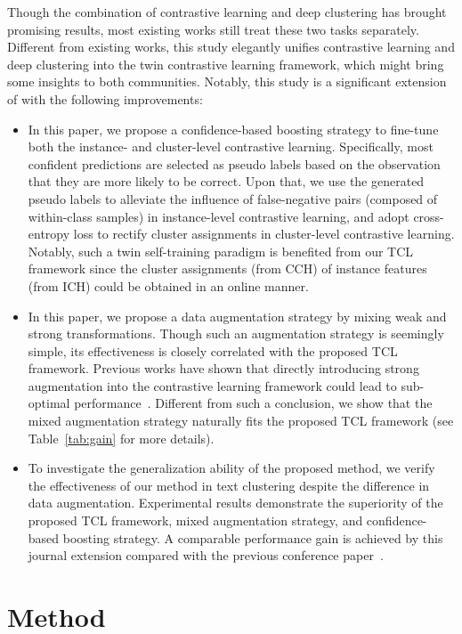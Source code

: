 Though the combination of contrastive learning and deep clustering has brought promising results, most existing works still treat these two tasks separately. Different from existing works, this study elegantly unifies contrastive learning and deep clustering into the twin contrastive learning framework, which might bring some insights to both communities. Notably, this study is a significant extension of \citep{CC} with the following improvements:
\begin{itemize}
	\item In this paper, we propose a confidence-based boosting strategy to fine-tune both the instance- and cluster-level contrastive learning. Specifically, most confident predictions are selected as pseudo labels based on the observation that they are more likely to be correct. Upon that, we use the generated pseudo labels to alleviate the influence of false-negative pairs (composed of within-class samples) in instance-level contrastive learning, and adopt cross-entropy loss to rectify cluster assignments in cluster-level contrastive learning. Notably, such a twin self-training paradigm is benefited from our TCL framework since the cluster assignments (from CCH) of instance features (from ICH) could be obtained in an online manner.
	\item In this paper, we propose a data augmentation strategy by mixing weak and strong transformations. Though such an augmentation strategy is seemingly simple, its effectiveness is closely correlated with the proposed TCL framework. Previous works have shown that directly introducing strong augmentation into the contrastive learning framework could lead to sub-optimal performance~\citep{StrongContrastive}. Different from such a conclusion, we show that the mixed augmentation strategy naturally fits the proposed TCL framework (see Table~\ref{tab:gain} for more details).
	\item To investigate the generalization ability of the proposed method, we verify the effectiveness of our method in text clustering despite the difference in data augmentation. Experimental results demonstrate the superiority of the proposed TCL framework, mixed augmentation strategy, and confidence-based boosting strategy. A comparable performance gain is achieved by this journal extension compared with the previous conference paper~\citep{CC}.
\end{itemize}

\section{Method}

